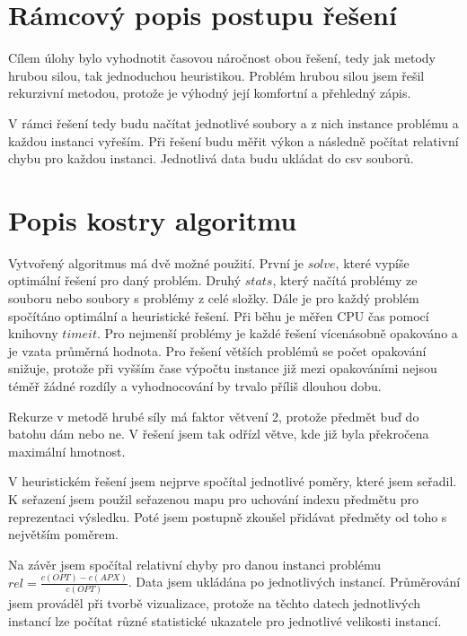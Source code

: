 \documentclass[11pt]{article}
\begin{document}
\section{Rámcový popis postupu řešení}
Cílem úlohy bylo vyhodnotit časovou náročnost obou řešení, tedy jak metody hrubou silou, tak jednoduchou heuristikou. Problém hrubou silou jsem řešil rekurzivní metodou, protože je výhodný její komfortní a přehledný zápis. 

V rámci řešení tedy budu načítat jednotlivé soubory a z nich instance problému a každou instanci vyřeším. Při řešení budu měřit výkon a následně počítat relativní chybu pro každou instanci. Jednotlivá data budu ukládat do csv souborů.

\section{Popis kostry algoritmu}\label{kap:1}
Vytvořený algoritmus má dvě možné použití. První je $solve$, které vypíše optimální řešení pro daný problém. Druhý $stats$, který načítá problémy ze souboru nebo soubory s problémy z celé složky. Dále je pro každý problém spočítáno optimální a heuristické řešení. Při běhu je měřen CPU čas pomocí knihovny $timeit$. Pro nejmenší problémy je každé řešení vícenásobně opakováno a je vzata průměrná hodnota. Pro řešení větších problémů se počet opakování snižuje, protože při vyšším čase výpočtu instance již mezi opakováními nejsou téměř žádné rozdíly a vyhodnocování by trvalo příliš dlouhou dobu.

Rekurze v metodě hrubé síly má faktor větvení 2, protože předmět buď do batohu dám nebo ne. V řešení jsem tak odřízl větve, kde již byla překročena maximální hmotnost.

V heuristickém řešení jsem nejprve spočítal jednotlivé poměry, které jsem seřadil. K seřazení jsem použil seřazenou mapu pro uchování indexu předmětu pro reprezentaci výsledku. Poté jsem postupně zkoušel přidávat předměty od toho s největším poměrem.

Na závěr jsem spočítal relativní chyby pro danou instanci problému $rel = \frac{c(OPT) - c(APX)}{c(OPT)}$. Data jsem ukládána po jednotlivých instancí. Průměrování jsem prováděl při tvorbě vizualizace, protože na těchto datech jednotlivých instancí lze počítat různé statistické ukazatele pro jednotlivé velikosti instancí.
\end{document}
